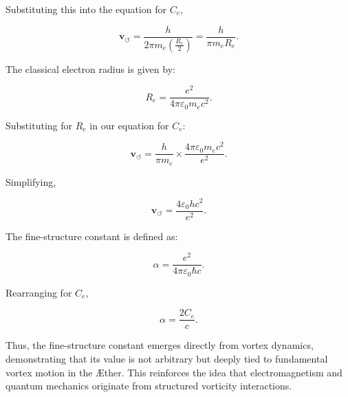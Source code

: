 Substituting this into the equation for $C_e$,

\begin{equation}
    \mathbf{v}_{\scriptscriptstyle\boldsymbol{\circlearrowleft}} = \frac{h}{2 \pi m_e \left(\frac{R_e}{2}\right)} = \frac{h}{\pi m_e R_e}.
\end{equation}

The classical electron radius is given by:

\begin{equation}
    R_e = \frac{e^2}{4 \pi \varepsilon_0 m_e c^2}.
\end{equation}

Substituting for $R_e$ in our equation for $C_e$:

\begin{equation}
    \mathbf{v}_{\scriptscriptstyle\boldsymbol{\circlearrowleft}} = \frac{h}{\pi m_e} \times \frac{4 \pi \varepsilon_0 m_e c^2}{e^2}.
\end{equation}

Simplifying,

\begin{equation}
    \mathbf{v}_{\scriptscriptstyle\boldsymbol{\circlearrowleft}} = \frac{4 \varepsilon_0 h c^2}{e^2}.
\end{equation}

The fine-structure constant is defined as:

\begin{equation}
    \alpha = \frac{e^2}{4 \pi \varepsilon_0 \hbar c}.
\end{equation}

Rearranging for $C_e$,

\begin{equation}
    \alpha = \frac{2 C_e}{c}.
\end{equation}

Thus, the fine-structure constant emerges directly from vortex dynamics, demonstrating that its value is not arbitrary but deeply tied to fundamental vortex motion in the Æther. This reinforces the idea that electromagnetism and quantum mechanics originate from structured vorticity interactions.
